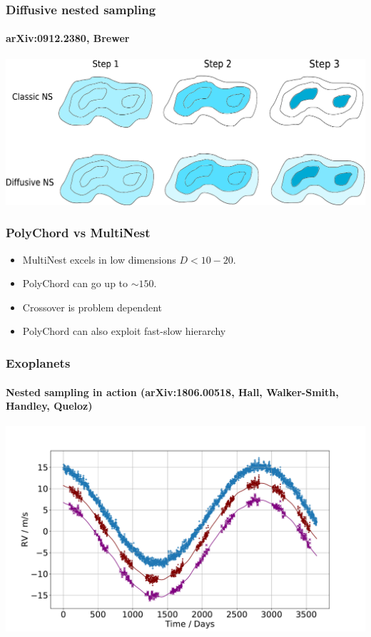 \documentclass[%
]{beamer}
\begin{document}
\begin{frame}
  \frametitle{Diffusive nested sampling}
  \framesubtitle{arXiv:0912.2380, Brewer}
  \includegraphics[width=\textwidth]{figures/dnest.pdf}
\end{frame}

\begin{frame}
\frametitle{PolyChord vs MultiNest}
\begin{itemize}
    \item MultiNest excels in low dimensions $D<10-20$.
    \item PolyChord can go up to $\sim 150$.
    \item Crossover is problem dependent
    \item PolyChord can also exploit fast-slow hierarchy
\end{itemize}
\end{frame}

\begin{frame}
  \frametitle{Exoplanets}
  \framesubtitle{Nested sampling in action (arXiv:1806.00518, Hall, Walker-Smith, Handley, Queloz)}
  \includegraphics[width=\textwidth]{figures/rv_full.pdf}
\end{frame}
\end{document}
